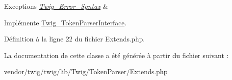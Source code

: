 \begin{DoxyExceptions}{Exceptions}
{\em \hyperlink{class_twig___error___syntax}{Twig\+\_\+\+Error\+\_\+\+Syntax}} & \\
\hline
\end{DoxyExceptions}


Implémente \hyperlink{interface_twig___token_parser_interface_a5dfa2e269321584fb74e8b43dabe0efd}{Twig\+\_\+\+Token\+Parser\+Interface}.



Définition à la ligne 22 du fichier Extends.\+php.



La documentation de cette classe a été générée à partir du fichier suivant \+:\begin{DoxyCompactItemize}
\item 
vendor/twig/twig/lib/\+Twig/\+Token\+Parser/Extends.\+php\end{DoxyCompactItemize}

